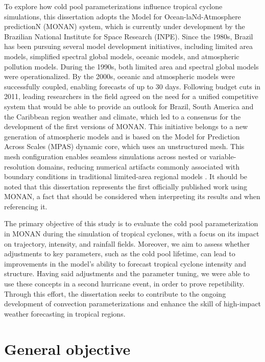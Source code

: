 To explore how cold pool parameterizations influence tropical cyclone simulations, this dissertation adopts the Model for Ocean-laNd-Atmosphere predictionN (MONAN) system, which is currently under development by the Brazilian National Institute for Space Research (INPE). Since the 1980s, Brazil has been pursuing several model development initiatives, including limited area models, simplified spectral global models, oceanic models, and atmospheric pollution models. During the 1990s, both limited area and spectral global models were operationalized. By the 2000s, oceanic and atmospheric models were successfully coupled, enabling forecasts of up to 30 days. Following budget cuts in 2011, leading researchers in the field agreed on the need for a unified competitive system that would be able to provide an outlook for Brazil, South America and the Caribbean region weather and climate, which led to a consensus for the development of the first versions of MONAN. This initiative belongs to a new generation of atmospheric models and is based on the Model for Prediction Across Scales (MPAS) dynamic core, which uses an unstructured mesh. This mesh configuration enables seamless simulations across nested or variable-resolution domains, reducing numerical artifacts commonly associated with boundary conditions in traditional limited-area regional models \cite{skamarock2012multiscale}. It should be noted that this dissertation represents the first officially published work using MONAN, a fact that should be considered when interpreting its results and when referencing it.

The primary objective of this study is to evaluate the cold pool parameterization in MONAN during the simulation of tropical cyclones, with a focus on its impact on trajectory, intensity, and rainfall fields. Moreover, we aim to assess whether adjustments to key parameters, such as the cold pool lifetime, can lead to improvements in the model’s ability to forecast tropical cyclone intensity and structure. Having said adjustments and the parameter tuning, we were able to use these concepts in a second hurricane event, in order to prove repetibility. Through this effort, the dissertation seeks to contribute to the ongoing development of convection parameterizations and enhance the skill of high-impact weather forecasting in tropical regions.

\section{General objective}

